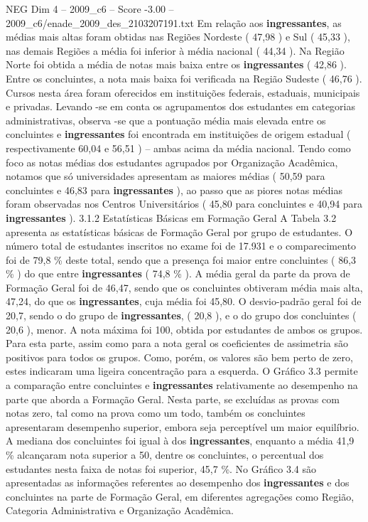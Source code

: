 \begin{textsample}{NEG Dim 4 – 2009\_c6 – Score -3.00 – 2009\_c6/enade\_2009\_des\_2103207191.txt}
Em relação aos \textbf{ingressantes}, as médias mais altas foram obtidas nas Regiões Nordeste ( 47,98 ) e Sul ( 45,33 ), nas demais Regiões a média foi inferior à média nacional ( 44,34 ).
Na Região Norte foi obtida a média de notas mais baixa entre os \textbf{ingressantes} ( 42,86 ).
Entre os concluintes, a nota mais baixa foi verificada na Região Sudeste ( 46,76 ).
Cursos nesta área foram oferecidos em instituições federais, estaduais, municipais e privadas.
Levando -se em conta os agrupamentos dos estudantes em categorias administrativas, observa -se que a pontuação média mais elevada entre os concluintes e \textbf{ingressantes} foi encontrada em instituições de origem estadual ( respectivamente 60,04 e 56,51 ) – ambas acima da média nacional.
Tendo como foco as notas médias dos estudantes agrupados por Organização Acadêmica, notamos que só universidades apresentam as maiores médias ( 50,59 para concluintes e 46,83 para \textbf{ingressantes} ), ao passo que as piores notas médias foram observadas nos Centros Universitários ( 45,80 para concluintes e 40,94 para \textbf{ingressantes} ). 3.1.2 Estatísticas Básicas em Formação Geral A Tabela 3.2 apresenta as estatísticas básicas de Formação Geral por grupo de estudantes.
O número total de estudantes inscritos no exame foi de 17.931 e o comparecimento foi de 79,8 \% deste total, sendo que a presença foi maior entre concluintes ( 86,3 \% ) do que entre \textbf{ingressantes} ( 74,8 \% ).
A média geral da parte da prova de Formação Geral foi de 46,47, sendo que os concluintes obtiveram média mais alta, 47,24, do que os \textbf{ingressantes}, cuja média foi 45,80.
O desvio-padrão geral foi de 20,7, sendo o do grupo de \textbf{ingressantes}, ( 20,8 ), e o do grupo dos concluintes ( 20,6 ), menor.
A nota máxima foi 100, obtida por estudantes de ambos os grupos.
Para esta parte, assim como para a nota geral os coeficientes de assimetria são positivos para todos os grupos.
Como, porém, os valores são bem perto de zero, estes indicaram uma ligeira concentração para a esquerda.
O Gráfico 3.3 permite a comparação entre concluintes e \textbf{ingressantes} relativamente ao desempenho na parte que aborda a Formação Geral.
Nesta parte, se excluídas as provas com notas zero, tal como na prova como um todo, também os concluintes apresentaram desempenho superior, embora seja perceptível um maior equilíbrio.
A mediana dos concluintes foi igual à dos \textbf{ingressantes}, enquanto a média 41,9 \% alcançaram nota superior a 50, dentre os concluintes, o percentual dos estudantes nesta faixa de notas foi superior, 45,7 \%.
No Gráfico 3.4 são apresentadas as informações referentes ao desempenho dos \textbf{ingressantes} e dos concluintes na parte de Formação Geral, em diferentes agregações como Região, Categoria Administrativa e Organização Acadêmica.

\end{textsample}
